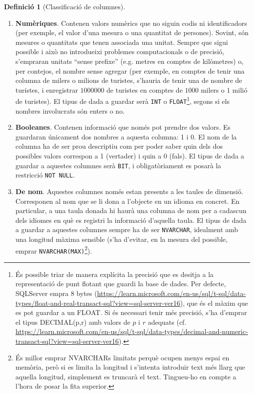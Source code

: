 \documentclass{article}
\theoremstyle{definition}
\newtheorem{definition}{Definició}
\begin{document}
\begin{definition}[Classificació de columnes]
\begin{enumerate}
    \item \textbf{Numèriques}. Contenen valors numèrics que no siguin codis ni identificadors (per exemple, el valor d'una mesura o una quantitat de persones). Sovint, són mesures o quantitats que tenen associada una unitat. Sempre que sigui possible i això no introdueixi problemes computacionals o de precisió, s'empraran unitats ``sense prefixe'' (e.g. metres en comptes de kilòmetres) o, per contejos, el nombre sense agregar (per exemple, en comptes de tenir una columna de milers o milions de turistes, s'hauria de tenir una de nombre de turistes, i enregistrar $1000000$ de turistes en comptes de $1000$ milers o $1$ milió de turistes). El tipus de dada a guardar serà \verb|INT| o \verb|FLOAT|\footnote{
    És possible triar de manera explícita la precisió que es desitja a la representació de punt flotant que guardi la base de dades. Per defecte, SQLServer empra 8 bytes (\href{https://learn.microsoft.com/en-us/sql/t-sql/data-types/float-and-real-transact-sql?view=sql-server-ver16}{https://learn.microsoft.com/en-us/sql/t-sql/data-types/float-and-real-transact-sql?view=sql-server-ver16}), que és el màxim que es pot guardar a un FLOAT. Si és necessari tenir més precisió, s'ha d'emprar el tipus DECIMAL(p,r) amb valors de $p$ i $r$ adequats (cf. \href{https://learn.microsoft.com/en-us/sql/t-sql/data-types/decimal-and-numeric-transact-sql?view=sql-server-ver16}{https://learn.microsoft.com/en-us/sql/t-sql/data-types/decimal-and-numeric-transact-sql?view=sql-server-ver16}).
    }, segons si els nombres involucrats són enters o no.

    \item \textbf{Booleanes}. Contenen informació que només pot prendre dos valors. Es guardaran únicament dos nombres a aquesta columna: 1 i 0. El nom de la columna ha de ser prou descriptiu com per poder saber quin dels dos possibles valors correspon a 1 (vertader) i quin a 0 (fals). El tipus de dada a guardar a aquestes columnes serà \verb|BIT|, i obligatòriament es posarà la restricció \verb|NOT NULL|.

    \item \textbf{De nom}. Aquestes columnes només estan presents a les taules de dimensió. Corresponen al nom que se li dona a l'objecte en un idioma en concret. En particular, a una taula donada hi haurà una columna de nom per a cadascun dels idiomes en què es registri la informació d'aquella taula. El tipus de dada a guardar a aquestes columnes sempre ha de ser \verb|NVARCHAR|, idealment amb una longitud màxima sensible (s'ha d'evitar, en la mesura del possible, emprar \verb|NVARCHAR(MAX)|\footnote{És millor emprar NVARCHARs limitats perquè ocupen menys espai en memòria, però si es limita la longitud i s'intenta introduir text més llarg que aquella longitud, simplement es truncarà el text. Tingueu-ho en compte a l'hora de posar la fita superior.}).


\end{enumerate}
\end{definition}
\end{document}
